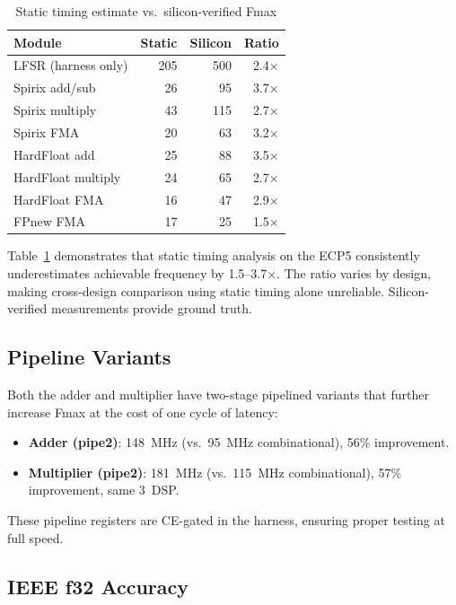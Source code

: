 \documentclass[10pt,twocolumn]{article}
\begin{document}
\begin{table}[t]
\centering
\caption{Static timing estimate vs.\ silicon-verified Fmax}
\label{tab:margin}
\small
\begin{tabular}{@{}l rrr@{}}
\toprule
\textbf{Module} & \textbf{Static} & \textbf{Silicon} & \textbf{Ratio} \\
\midrule
LFSR (harness only) & 205 & 500 & 2.4$\times$ \\
Spirix add/sub & 26 & 95 & 3.7$\times$ \\
Spirix multiply & 43 & 115 & 2.7$\times$ \\
Spirix FMA & 20 & 63 & 3.2$\times$ \\
HardFloat add & 25 & 88 & 3.5$\times$ \\
HardFloat multiply & 24 & 65 & 2.7$\times$ \\
HardFloat FMA & 16 & 47 & 2.9$\times$ \\
FPnew FMA & 17 & 25 & 1.5$\times$ \\
\bottomrule
\end{tabular}
\end{table}

Table~\ref{tab:margin} demonstrates that static timing analysis on the
ECP5 consistently underestimates achievable frequency by 1.5--3.7$\times$.
The ratio varies by design, making cross-design comparison using static
timing alone unreliable.  Silicon-verified measurements provide ground
truth.

\subsection{Pipeline Variants}

Both the adder and multiplier have two-stage pipelined variants that
further increase Fmax at the cost of one cycle of latency:

\begin{itemize}
  \item \textbf{Adder (pipe2)}: 148~MHz (vs.\ 95~MHz combinational),
        56\% improvement.
  \item \textbf{Multiplier (pipe2)}: 181~MHz (vs.\ 115~MHz combinational),
        57\% improvement, same 3~DSP.
\end{itemize}

These pipeline registers are CE-gated in the harness, ensuring proper
testing at full speed.

\subsection{IEEE f32 Accuracy}
\end{document}
